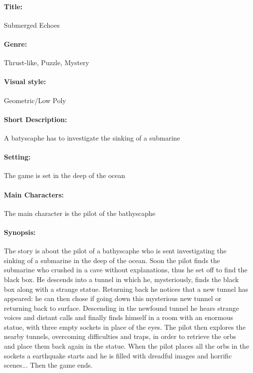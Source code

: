 \documentclass{article}
\begin{document}
\paragraph{Title: } Submerged Echoes

\paragraph{Genre: } Thrust-like, Puzzle, Mystery

\paragraph{Visual style: } Geometric/Low Poly

\paragraph{Short Description: } A batyscaphe has to investigate the sinking of a submarine

\paragraph{Setting: } The game is set in the deep of the ocean

\paragraph{Main Characters: } The main character is the pilot of the bathyscaphe

\paragraph{Synopsis: } The story is about the pilot of a bathyscaphe who is sent investigating the
sinking of a submarine in the deep of the ocean.
Soon the pilot finds the submarine who crushed in a cave without explanations, thus he set off to find
the black box.
He descends into a tunnel in which he, mysteriously, finds the black box along with a strange statue.
Returning back he notices that a new tunnel has appeared: he can then chose if going down this mysterious new tunnel or returning back to surface.
Descending in the newfound tunnel he hears strange voices and distant calls and finally finds himself in a room with an enormous statue, with three empty sockets in place of the eyes.
The pilot then explores the nearby tunnels, overcoming difficulties and traps, in order to retrieve the orbs and place them back again in the statue.
When the pilot places all the orbs in the sockets a earthquake starts and he is filled with dreadful images and horrific scenes... Then the game ends.
\end{document}
